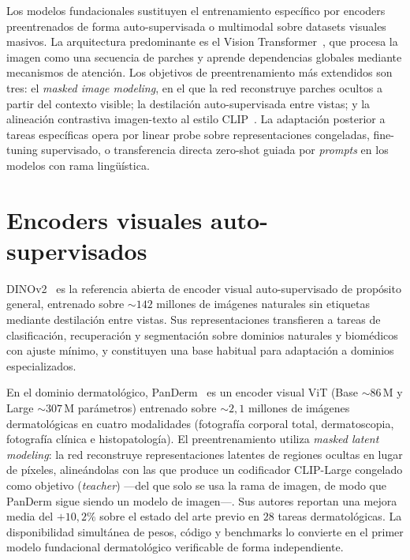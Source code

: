 Los modelos fundacionales sustituyen el entrenamiento específico por
encoders preentrenados de forma auto-supervisada o multimodal sobre
datasets visuales masivos. La arquitectura predominante es el Vision
Transformer~\cite{vit2021}, que procesa la imagen como una secuencia
de parches y aprende dependencias globales mediante mecanismos de
atención. Los objetivos de preentrenamiento más extendidos son tres:
el \emph{masked image modeling}, en el que la red reconstruye
parches ocultos a partir del contexto visible; la destilación
auto-supervisada entre vistas; y la alineación contrastiva
imagen-texto al estilo CLIP~\cite{clip2021}. La adaptación posterior
a tareas específicas opera por linear probe sobre representaciones
congeladas, fine-tuning supervisado, o transferencia directa
zero-shot guiada por \emph{prompts} en los modelos con rama
lingüística.

\section{Encoders visuales auto-supervisados}
\label{sec:encoders-visuales}

DINOv2~\cite{dinov2} es la referencia abierta de encoder visual
auto-supervisado de propósito general, entrenado sobre
$\sim 142$ millones de imágenes naturales sin etiquetas mediante
destilación entre vistas. Sus representaciones transfieren a tareas
de clasificación, recuperación y segmentación sobre dominios
naturales y biomédicos con ajuste mínimo, y constituyen una base
habitual para adaptación a dominios especializados.

En el dominio dermatológico, PanDerm~\cite{panderm2025} es un
encoder visual ViT (Base $\sim 86$\,M y Large $\sim 307$\,M
parámetros) entrenado sobre $\sim 2{,}1$ millones de imágenes
dermatológicas en cuatro modalidades (fotografía corporal total,
dermatoscopia, fotografía clínica e histopatología). El
preentrenamiento utiliza \emph{masked latent modeling}: la red
reconstruye representaciones latentes de regiones ocultas en lugar
de píxeles, alineándolas con las que produce un codificador CLIP-Large
congelado como objetivo (\emph{teacher}) ---del que solo se usa la
rama de imagen, de modo que PanDerm sigue siendo un modelo de
imagen---. Sus autores reportan una mejora media del
$+10{,}2\%$ sobre el estado del arte previo en $28$ tareas
dermatológicas. La disponibilidad simultánea de pesos, código y
benchmarks lo convierte en el primer modelo fundacional dermatológico
verificable de forma independiente.

